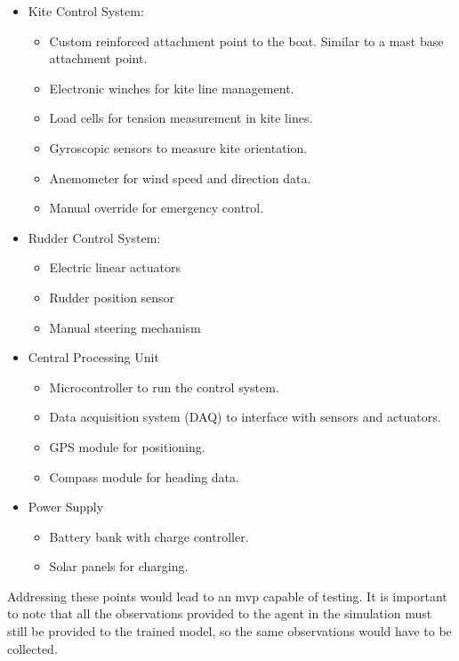 \begin{itemize}
    \item Kite Control System:
    \begin{itemize}
        \item Custom reinforced attachment point to the boat. Similar to a mast base attachment point.
        \item Electronic winches for kite line management.
        \item Load cells for tension measurement in kite lines.
        \item Gyroscopic sensors to measure kite orientation.
        \item Anemometer for wind speed and direction data.
        \item Manual override for emergency control.
    \end{itemize}
    \item Rudder Control System:
    \begin{itemize}
        \item Electric linear actuators
        \item Rudder position sensor
        \item Manual steering mechanism
    \end{itemize}
    \item Central Processing Unit
    \begin{itemize}
        \item Microcontroller to run the control system.
        \item Data acquisition system (DAQ) to interface with sensors and actuators.
        \item GPS module for positioning.
        \item Compass module for heading data.
    \end{itemize}
    \item Power Supply
    \begin{itemize}
        \item Battery bank with charge controller.
        \item Solar panels for charging.
    \end{itemize}
\end{itemize}

Addressing these points would lead to an mvp capable of testing. It is important to note that all the observations provided to the agent in the simulation must still be provided to the trained model, so the same observations would have to be collected.

